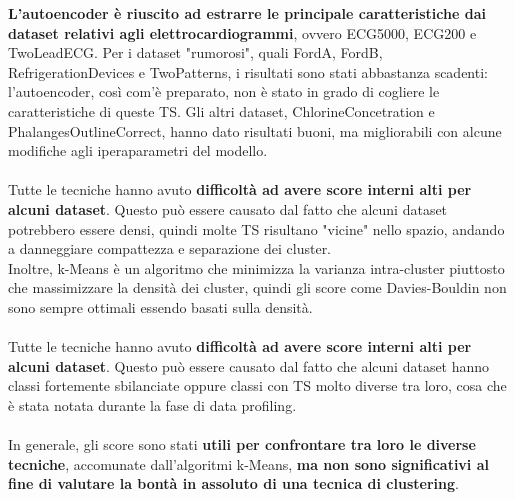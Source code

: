\textbf{L'autoencoder è riuscito ad estrarre le principale caratteristiche dai dataset relativi agli elettrocardiogrammi}, ovvero ECG5000, ECG200 e TwoLeadECG.
Per i dataset "rumorosi", quali FordA, FordB, RefrigerationDevices e TwoPatterns, i risultati sono stati abbastanza scadenti: l'autoencoder, così com'è preparato, non è stato in grado di cogliere le caratteristiche di queste TS.
Gli altri dataset, ChlorineConcetration e PhalangesOutlineCorrect, hanno dato risultati buoni, ma migliorabili con alcune modifiche agli iperaparametri del modello.\\
\\
Tutte le tecniche hanno avuto \textbf{difficoltà ad avere score interni alti per alcuni dataset}. Questo può essere causato dal fatto che alcuni dataset potrebbero essere densi, quindi molte TS risultano "vicine" nello spazio, andando a danneggiare compattezza e separazione dei cluster.\\
Inoltre, k-Means è un algoritmo che minimizza la varianza intra-cluster piuttosto che massimizzare la densità dei cluster, quindi gli score come Davies-Bouldin non sono sempre ottimali essendo basati sulla densità.\\
\\
Tutte le tecniche hanno avuto \textbf{difficoltà ad avere score interni alti per alcuni dataset}. Questo può essere causato dal fatto che alcuni dataset hanno classi fortemente sbilanciate oppure classi con TS molto diverse tra loro, cosa che è stata notata durante la fase di data profiling.\\
\\
In generale, gli score sono stati \textbf{utili per confrontare tra loro le diverse tecniche}, accomunate dall'algoritmi k-Means, \textbf{ma non sono significativi al fine di valutare la bontà in assoluto di una tecnica di clustering}.